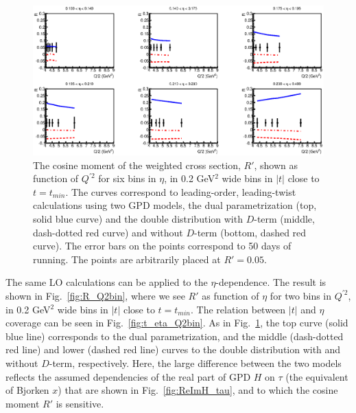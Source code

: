\begin{figure}[t]
\includegraphics[scale=0.8]{R_etabin.eps}
\caption{\small{
The cosine moment of the weighted cross section, $R'$, shown as function of
$Q^{\prime 2}$ for six bins in $\eta$, in 0.2 GeV$^2$ wide bins in $|t|$
close to $t=t_{min}$. The curves correspond to leading-order, leading-twist 
calculations using two GPD models, the dual parametrization
\cite{Polyakov:2002wz,Guzey:2006xi,Guzey:2008ys,Polyakov:2008aa} (top, solid
blue curve) and the double distribution \cite{Radyushkin:1998es} with $D$-term
(middle, dash-dotted red curve) and without $D$-term (bottom, dashed red
curve). The error bars on the points correspond to 50 days of running.
The points are arbitrarily placed at $R' = 0.05$.}}
\label{fig:R_etabin}
\end{figure}

The same LO calculations can be applied to the $\eta$-dependence. The result
is shown in Fig.~\ref{fig:R_Q2bin}, where we see $R'$ as function of $\eta$
for two bins in $Q^{\prime 2}$, in 0.2 GeV$^2$ wide bins in $|t|$ close to 
$t=t_{min}$. The relation between $|t|$ and $\eta$ coverage can be seen in
Fig.~\ref{fig:t_eta_Q2bin}. As in Fig.~\ref{fig:R_etabin}, the top curve
(solid blue line) corresponds to the dual parametrization, and the middle
(dash-dotted red line) and lower (dashed red line) curves to the
double distribution with and without $D$-term, respectively. Here, the large
difference between the two models reflects the assumed dependencies of the
real part of GPD $H$ on $\tau$ (the equivalent of Bjorken $x$) that are shown
in Fig.~\ref{fig:ReImH_tau}, and to which the cosine moment $R'$ is sensitive.

